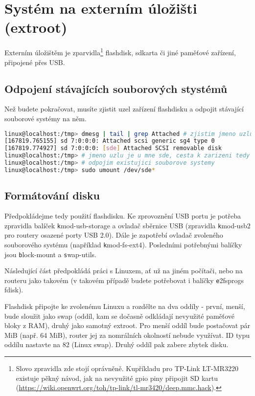 \section{Systém na externím úložišti (extroot)}
\label{extroot}
Externím úložištěm je zparvidla\footnote{Slovo zpravidla zde stojí oprávněně.
Kupříkladu pro TP-Link LT-MR3220 existuje pěkný návod, jak na nevyužité \gls{gpio}
piny připojit SD kartu (\url{https://wiki.openwrt.org/toh/tp-link/tl-mr3420/deep.mmc.hack}).}
flashdisk, sdkarta či jiné paměťové zařízení, připojené přes USB.

\subsection{Odpojení stávajících souborových stystémů}
\label{extroot:umount}
Než budete pokračovat, musíte zjistit uzel zařízení flashdisku a odpojit
stávající souborové systémy na něm.
\begin{lstlisting}[language=sh]
linux@localhost:/tmp> dmesg | tail | grep Attached # zjistim jmeno uzlu
[167819.765155] sd 7:0:0:0: Attached scsi generic sg4 type 0
[167819.774927] sd 7:0:0:0: [sde] Attached SCSI removable disk
linux@localhost:/tmp> # jmeno uzlu je u mne sde, cesta k zarizeni tedy /dev/sde
linux@localhost:/tmp> # odpojim existujici souborove systemy
linux@localhost:/tmp> sudo umount /dev/sde*
\end{lstlisting}

\subsection{Formátování disku}
Předpokládejme tedy použití flashdisku. Ke zprovoznění USB portu je potřeba
zpravidla balíček {\texttt kmod-usb-storage} a ovladač sběrnice USB (zpravidla
{\texttt kmod-usb2} pro routery osazené porty USB 2.0). Dále je zapotřebí
ovladač zvoleného souborového systému (například {\texttt kmod-fs-ext4}).
Posledními potřebnými balíčky jsou {\texttt block-mount} a {\texttt swap-utils}.

Následující část předpokládá práci s Linuxem, ať už na jiném počítači, nebo
na routeru jako takovém (v takovém případě budete potřebovat i balíčky
{\texttt e2fsprogs fdisk}).

Flashdisk připojte ke zvolenému Linuxu a rozdělte na dva oddíly - první, menší,
bude sloužit jako swap (oddíl, kam se dočasně odkládají nevyužité paměťové
bloky z RAM), druhý jako samotný extroot. Pro menší oddíl bude postačovat
pár MiB (např. 64 MiB), router jej za nomrálních okolností nebude využívat.
ID typu oddílu nastavte na 82 (Linux swap). Druhý oddíl pak zabere zbytek
disku.

